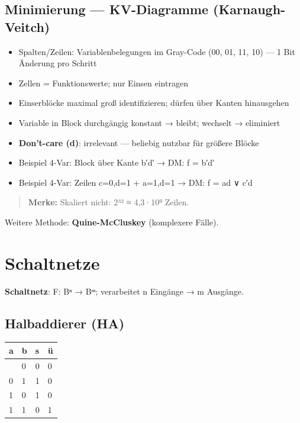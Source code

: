\documentclass[11pt, a4paper]{article}
\begin{document}
\subsection{Minimierung — KV-Diagramme (Karnaugh-Veitch)}

\begin{itemize}
  \item Spalten/Zeilen: Variablenbelegungen im Gray-Code (00, 01, 11, 10) — 1 Bit Änderung pro Schritt
  \item Zellen = Funktionswerte; nur Einsen eintragen
  \item Einserblöcke maximal groß identifizieren; dürfen über Kanten hinausgehen
  \item Variable in Block durchgängig konstant → bleibt; wechselt → eliminiert
  \item \textbf{Don't-care (d)}: irrelevant — beliebig nutzbar für größere Blöcke
  \item Beispiel 4-Var: Block über Kante b′d′ → DM: f = b′d′
  \item Beispiel 4-Var: Zeilen c=0,d=1 + a=1,d=1 → DM: f = ad ∨ c′d
\end{itemize}

\begin{quote}
\textbf{Merke:} Skaliert nicht: 2³² ≈ 4,3·10⁹ Zeilen.
\end{quote}

Weitere Methode: \textbf{Quine-McCluskey} (komplexere Fälle).



\section{Schaltnetze}

\textbf{Schaltnetz}: F: Bⁿ → Bᵐ; verarbeitet n Eingänge → m Ausgänge.



\subsection{Halbaddierer (HA)}


{\small
\begin{tabularx}{\linewidth}{XXXX}
\hline
\rowcolor{tableheadbg}
{\color{white}\textbf{a}} & {\color{white}\textbf{b}} & {\color{white}\textbf{s}} & {\color{white}\textbf{ü}} \\[2pt]
\hline
\endhead
\hline
\endfoot
0 & 0 & 0 & 0 \\
0 & 1 & 1 & 0 \\
1 & 0 & 1 & 0 \\
1 & 1 & 0 & 1 \\
\end{tabularx}
}
\end{document}
